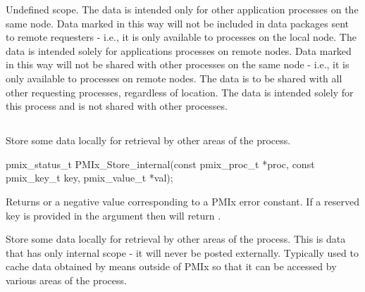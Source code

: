 \begin{constantdesc}
%
Undefined scope.
%
The data is intended only for other application processes on the same node.
Data marked in this way will not be included in data packages sent to remote requesters - i.e., it is only available to processes on the local node.
%
The data is intended solely for applications processes on remote nodes.
Data marked in this way will not be shared with other processes on the same node - i.e., it is only available to  processes on remote nodes.
%
The data is to be shared with all other requesting processes, regardless of location.
%
The data is intended solely for this process and is not shared with other processes.
%
\end{constantdesc}


\subsection{}

\summary

Store some data locally for retrieval by other areas of the process.

\format

\cspecificstart
\begin{codepar}
pmix_status_t
PMIx_Store_internal(const pmix_proc_t *proc,
                    const pmix_key_t key,
                    pmix_value_t *val);
\end{codepar}
\cspecificend

\begin{arglist}
\end{arglist}

Returns  or a negative value corresponding to a PMIx error constant.
If a reserved key is provided in the  argument then  will return .

\descr

Store some data locally for retrieval by other areas of the process.
This is data that has only internal scope - it will never be posted externally. Typically used to cache data obtained by means outside of \ac{PMIx} so that it can be accessed by various areas of the process.


